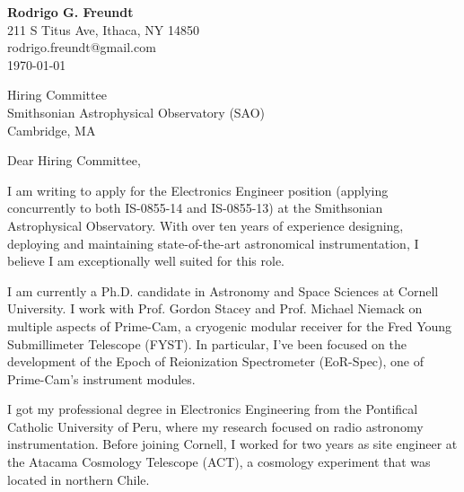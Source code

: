 \documentclass[letterpaper,11pt]{article}
\begin{document}
\textbf{Rodrigo G. Freundt}\\
211 S Titus Ave, Ithaca, NY 14850\\
rodrigo.freundt@gmail.com\\

\vspace{1em}
\today

\vspace{1em}
Hiring Committee\\
Smithsonian Astrophysical Observatory (SAO)\\
Cambridge, MA

\vspace{1em}
Dear Hiring Committee,

I am writing to apply for the Electronics Engineer position (applying concurrently to both IS-0855-14 and IS-0855-13) at the Smithsonian Astrophysical Observatory. With over ten years of experience designing, deploying and maintaining state-of-the-art astronomical instrumentation, I believe I am exceptionally well suited for this role.

I am currently a Ph.D. candidate in Astronomy and Space Sciences at Cornell University. I work with Prof. Gordon Stacey and Prof. Michael Niemack on multiple aspects of Prime-Cam, a cryogenic modular receiver for the Fred Young Submillimeter Telescope (FYST). In particular, I've been focused on the development of the Epoch of Reionization Spectrometer (EoR-Spec), one of Prime-Cam's instrument modules.

I got my professional degree in Electronics Engineering from the Pontifical Catholic University of Peru, where my research focused on radio astronomy instrumentation. Before joining Cornell, I worked for two years as site engineer at the Atacama Cosmology Telescope (ACT), a cosmology experiment that was located in northern Chile.

\end{document}
